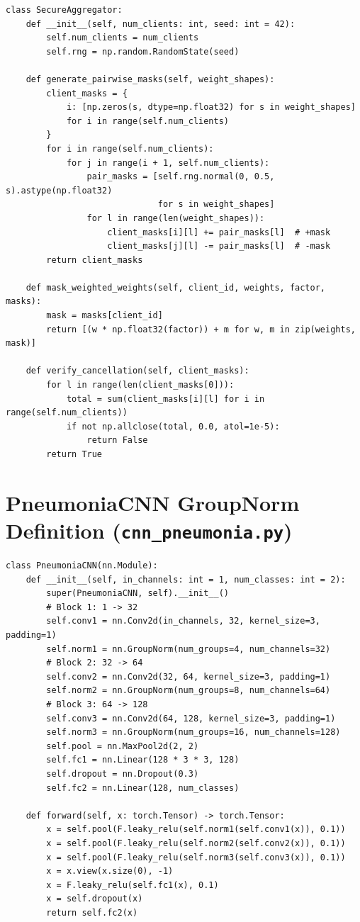 \documentclass[12pt,a4paper]{report}
\begin{document}
\begin{small}
\begin{verbatim}
class SecureAggregator:
    def __init__(self, num_clients: int, seed: int = 42):
        self.num_clients = num_clients
        self.rng = np.random.RandomState(seed)

    def generate_pairwise_masks(self, weight_shapes):
        client_masks = {
            i: [np.zeros(s, dtype=np.float32) for s in weight_shapes]
            for i in range(self.num_clients)
        }
        for i in range(self.num_clients):
            for j in range(i + 1, self.num_clients):
                pair_masks = [self.rng.normal(0, 0.5, s).astype(np.float32) 
                              for s in weight_shapes]
                for l in range(len(weight_shapes)):
                    client_masks[i][l] += pair_masks[l]  # +mask
                    client_masks[j][l] -= pair_masks[l]  # -mask
        return client_masks

    def mask_weighted_weights(self, client_id, weights, factor, masks):
        mask = masks[client_id]
        return [(w * np.float32(factor)) + m for w, m in zip(weights, mask)]

    def verify_cancellation(self, client_masks):
        for l in range(len(client_masks[0])):
            total = sum(client_masks[i][l] for i in range(self.num_clients))
            if not np.allclose(total, 0.0, atol=1e-5):
                return False
        return True
\end{verbatim}
\end{small}

\section{PneumoniaCNN GroupNorm Definition (\texttt{cnn\_pneumonia.py})}
\begin{small}
\begin{verbatim}
class PneumoniaCNN(nn.Module):
    def __init__(self, in_channels: int = 1, num_classes: int = 2):
        super(PneumoniaCNN, self).__init__()
        # Block 1: 1 -> 32
        self.conv1 = nn.Conv2d(in_channels, 32, kernel_size=3, padding=1)
        self.norm1 = nn.GroupNorm(num_groups=4, num_channels=32)
        # Block 2: 32 -> 64
        self.conv2 = nn.Conv2d(32, 64, kernel_size=3, padding=1)
        self.norm2 = nn.GroupNorm(num_groups=8, num_channels=64)
        # Block 3: 64 -> 128
        self.conv3 = nn.Conv2d(64, 128, kernel_size=3, padding=1)
        self.norm3 = nn.GroupNorm(num_groups=16, num_channels=128)
        self.pool = nn.MaxPool2d(2, 2)
        self.fc1 = nn.Linear(128 * 3 * 3, 128)
        self.dropout = nn.Dropout(0.3)
        self.fc2 = nn.Linear(128, num_classes)

    def forward(self, x: torch.Tensor) -> torch.Tensor:
        x = self.pool(F.leaky_relu(self.norm1(self.conv1(x)), 0.1))
        x = self.pool(F.leaky_relu(self.norm2(self.conv2(x)), 0.1))
        x = self.pool(F.leaky_relu(self.norm3(self.conv3(x)), 0.1))
        x = x.view(x.size(0), -1)
        x = F.leaky_relu(self.fc1(x), 0.1)
        x = self.dropout(x)
        return self.fc2(x)
\end{verbatim}
\end{small}
\end{document}

